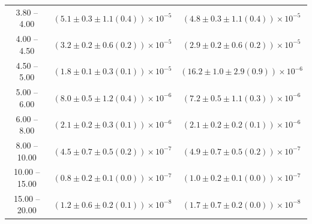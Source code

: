 \begin{table}
\begin{center}
\begin{tabular}{ c | c c }
3.80 -- 4.00 & $(5.1\pm0.3\pm1.1(0.4))\times10^{-5}$ & $(4.8\pm0.3\pm1.1(0.4))\times10^{-5}$ \\ 
4.00 -- 4.50 & $(3.2\pm0.2\pm0.6(0.2))\times10^{-5}$ & $(2.9\pm0.2\pm0.6(0.2))\times10^{-5}$ \\ 
4.50 -- 5.00 & $(1.8\pm0.1\pm0.3(0.1))\times10^{-5}$ & $(16.2\pm1.0\pm2.9(0.9))\times10^{-6}$ \\ 
5.00 -- 6.00 & $(8.0\pm0.5\pm1.2(0.4))\times10^{-6}$ & $(7.2\pm0.5\pm1.1(0.3))\times10^{-6}$ \\ 
6.00 -- 8.00 & $(2.1\pm0.2\pm0.3(0.1))\times10^{-6}$ & $(2.1\pm0.2\pm0.2(0.1))\times10^{-6}$ \\ 
8.00 -- 10.00 & $(4.5\pm0.7\pm0.5(0.2))\times10^{-7}$ & $(4.9\pm0.7\pm0.5(0.2))\times10^{-7}$ \\ 
10.00 -- 15.00 & $(0.8\pm0.2\pm0.1(0.0))\times10^{-7}$ & $(1.0\pm0.2\pm0.1(0.0))\times10^{-7}$ \\ 
15.00 -- 20.00 & $(1.2\pm0.6\pm0.2(0.1))\times10^{-8}$ & $(1.7\pm0.7\pm0.2(0.0))\times10^{-8}$ \\ 
\hline
\end{tabular}
\end{center}
\end{table}
 
